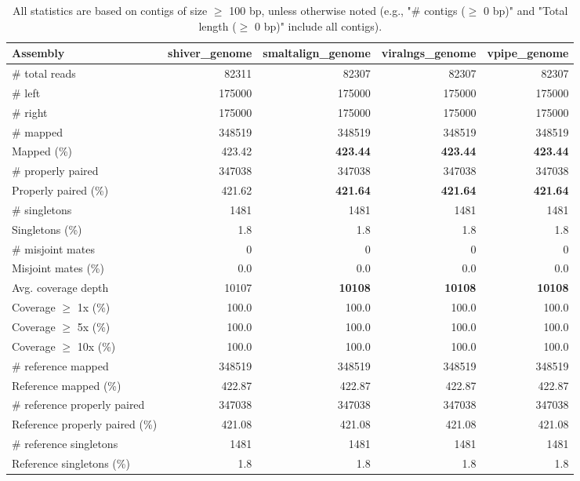 \documentclass[12pt,a4paper]{article}
\begin{document}
\begin{table}[ht]
\begin{center}
\caption{All statistics are based on contigs of size $\geq$ 100 bp, unless otherwise noted (e.g., "\# contigs ($\geq$ 0 bp)" and "Total length ($\geq$ 0 bp)" include all contigs).}
\begin{tabular}{|l*{4}{|r}|}
\hline
Assembly & shiver\_genome & smaltalign\_genome & viralngs\_genome & vpipe\_genome \\ \hline
\# total reads & 82311 & 82307 & 82307 & 82307 \\ \hline
\# left & 175000 & 175000 & 175000 & 175000 \\ \hline
\# right & 175000 & 175000 & 175000 & 175000 \\ \hline
\# mapped & 348519 & 348519 & 348519 & 348519 \\ \hline
Mapped (\%) & 423.42 & {\bf 423.44} & {\bf 423.44} & {\bf 423.44} \\ \hline
\# properly paired & 347038 & 347038 & 347038 & 347038 \\ \hline
Properly paired (\%) & 421.62 & {\bf 421.64} & {\bf 421.64} & {\bf 421.64} \\ \hline
\# singletons & 1481 & 1481 & 1481 & 1481 \\ \hline
Singletons (\%) & 1.8 & 1.8 & 1.8 & 1.8 \\ \hline
\# misjoint mates & 0 & 0 & 0 & 0 \\ \hline
Misjoint mates (\%) & 0.0 & 0.0 & 0.0 & 0.0 \\ \hline
Avg. coverage depth & 10107 & {\bf 10108} & {\bf 10108} & {\bf 10108} \\ \hline
Coverage $\geq$ 1x (\%) & 100.0 & 100.0 & 100.0 & 100.0 \\ \hline
Coverage $\geq$ 5x (\%) & 100.0 & 100.0 & 100.0 & 100.0 \\ \hline
Coverage $\geq$ 10x (\%) & 100.0 & 100.0 & 100.0 & 100.0 \\ \hline
\# reference mapped & 348519 & 348519 & 348519 & 348519 \\ \hline
Reference mapped (\%) & 422.87 & 422.87 & 422.87 & 422.87 \\ \hline
\# reference properly paired & 347038 & 347038 & 347038 & 347038 \\ \hline
Reference properly paired (\%) & 421.08 & 421.08 & 421.08 & 421.08 \\ \hline
\# reference singletons & 1481 & 1481 & 1481 & 1481 \\ \hline
Reference singletons (\%) & 1.8 & 1.8 & 1.8 & 1.8 \\ \hline

\end{tabular}
\end{center}
\end{table}
\end{document}
